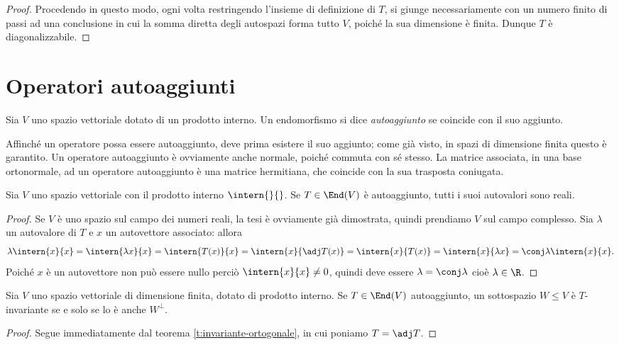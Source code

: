 \begin{proof}
	Procedendo in questo modo, ogni volta restringendo l'insieme di definizione di $T$, si giunge necessariamente con un numero finito di passi ad una conclusione in cui la somma diretta degli autospazi forma tutto $V$, poiché la sua dimensione è finita.
	Dunque $T$ è diagonalizzabile.
\end{proof}

\section{Operatori autoaggiunti} \label{sec:operatori-autoaggiunti}
\begin{definizione} \label{d:operatore-autoaggiunto}
	Sia $V$ uno spazio vettoriale dotato di un prodotto interno.
	Un endomorfismo si dice \emph{autoaggiunto} se coincide con il suo aggiunto.
\end{definizione}
Affinch\'e un operatore possa essere autoaggiunto, deve prima esistere il suo aggiunto; come già visto, in spazi di dimensione finita questo è garantito.
Un operatore autoaggiunto è ovviamente anche normale, poich\'e commuta con s\'e stesso.
La matrice associata, in una base ortonormale, ad un operatore autoaggiunto è una matrice hermitiana, che coincide con la sua trasposta coniugata.
\begin{teorema}	\label{t:autovalori-operatore-autoaggiunto}
	Sia $V$ uno spazio vettoriale con il prodotto interno $\intern{}{}$.
	Se $T\in\End(V)$ è autoaggiunto, tutti i suoi autovalori sono reali.
\end{teorema}
\begin{proof}
	Se $V$ è uno spazio sul campo dei numeri reali, la tesi è ovviamente già dimostrata, quindi prendiamo $V$ sul campo complesso.
	Sia $\lambda$ un autovalore di $T$ e $  x$ un autovettore associato: allora
	\begin{equation}
		\lambda\intern{  x}{  x}=\intern{\lambda  x}{  x}=\intern{T(  x)}{  x}=\intern{  x}{\adj T(  x)}=\intern{  x}{T(  x)}=\intern{  x}{\lambda  x}=\conj\lambda\intern{  x}{  x}.
	\end{equation}
	Poich\'e $  x$ è un autovettore non può essere nullo perciò $\intern{  x}{  x}\neq 0$, quindi deve essere $\lambda=\conj\lambda$ cioè $\lambda\in\R$.
\end{proof}

\begin{teorema}
	Sia $V$ uno spazio vettoriale di dimensione finita, dotato di prodotto interno.
	Se $T\in\End(V)$ autoaggiunto, un sottospazio $W\leq V$ è $T$-invariante se e solo se lo è anche $W^\perp$.
\end{teorema}
\begin{proof}
	Segue immediatamente dal teorema \ref{t:invariante-ortogonale}, in cui poniamo $T=\adj T$.
\end{proof}

